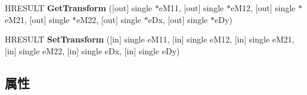 \begin{DoxyCompactItemize}
H\+R\+E\+S\+U\+LT {\bfseries Get\+Transform} (\mbox{[}out\mbox{]} single $\ast$e\+M11, \mbox{[}out\mbox{]} single $\ast$e\+M12, \mbox{[}out\mbox{]} single $\ast$e\+M21, \mbox{[}out\mbox{]} single $\ast$e\+M22, \mbox{[}out\mbox{]} single $\ast$e\+Dx, \mbox{[}out\mbox{]} single $\ast$e\+Dy)
\item 
\mbox{\label{interface_m_s_i_n_k_a_u_t_lib_1_1_i_ink_transform_a0be212de35a8d29643ba18984bc812eb}} 
H\+R\+E\+S\+U\+LT {\bfseries Set\+Transform} (\mbox{[}in\mbox{]} single e\+M11, \mbox{[}in\mbox{]} single e\+M12, \mbox{[}in\mbox{]} single e\+M21, \mbox{[}in\mbox{]} single e\+M22, \mbox{[}in\mbox{]} single e\+Dx, \mbox{[}in\mbox{]} single e\+Dy)
\end{DoxyCompactItemize}
\subsection*{属性}
